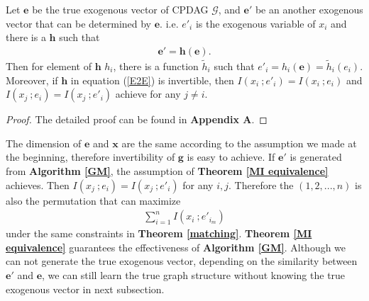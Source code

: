 \documentclass[twoside,11pt]{article}
\begin{document}

\begin{theorem}
\label{MI equivalence}
Let $\mathbf e$ be the true exogenous vector of CPDAG $\mathcal G$, and $\mathbf e'$ be an another exogenous vector that can be determined by $\mathbf e$. i.e. $e'_i$ is the exogenous variable of $x_i$ and there is a $\mathbf h$ such that
\begin{align*}
    \mathbf e'=\mathbf h(\mathbf e).
\end{align*}
Then for element of $\mathbf h$ $h_i$, there is a function $\tilde h_i$ such that $e'_i=h_i(\mathbf e)=\tilde h_i(e_i)$. Moreover, if $\mathbf h$ in equation (\ref{E2E}) is invertible, then $I(x_i\ ; e'_i)=I(x_i\ ; e_i)$ and $I(x_j\ ; e_i)=I(x_j\ ; e'_i)$ achieve for any $j\neq i$.
\end{theorem}
\begin{proof}
The detailed proof can be found in \textbf{Appendix A}.
\end{proof}

The dimension of $\mathbf e$ and $\mathbf x$ are the same according to the assumption we made at the beginning, therefore invertibility of $\mathbf g$ is easy to achieve. If $\mathbf e'$ is generated from \textbf{Algorithm \ref{GM}}, the assumption of \textbf{Theorem \ref{MI equivalence}} achieves. Then $I(x_j\ ;e_i)=I(x_j\ ;e'_i)$ for any $i,j$. Therefore the $(1, 2, ..., n)$ is also the permutation that can maximize 
\begin{align*}
    \sum_{i=1}^n I(x_i\ ;e'_{i_m})
\end{align*}
under the same constraints in \textbf{Theorem \ref{matching}}. \textbf{Theorem \ref{MI equivalence}} guarantees the effectiveness of \textbf{Algorithm \ref{GM}}.
Although we can not generate the true exogenous vector, depending on the similarity between $\mathbf e'$ and $\mathbf e$, we can still learn the true graph structure without knowing the true exogenous vector in next subsection.
\end{document}

